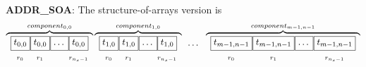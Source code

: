 \textbf{ADDR\_SOA}: The structure-of-arrays version is
\[
\overbrace{
\begin{array}{cc} \boxed{t_{0,0}} \\  _{r_0} \end{array} \mkern-17mu
\begin{array}{cc} \boxed{t_{0,0}} \\  _{r_1} \end{array} \mkern-17mu
\begin{array}{cc} \boxed{\ldots\vphantom{t_{0,0}}} \\ \phantom{r_2}\end{array} \mkern-18mu
\begin{array}{cc} \boxed{t_{0,0}} \\  _{r_{n_s-1}} \end{array}
}^{component_{0,0}}
\overbrace{
\begin{array}{cc} \boxed{t_{1,0}} \\  _{r_0} \end{array} \mkern-17mu
\begin{array}{cc} \boxed{t_{1,0}} \\  _{r_1} \end{array} \mkern-17mu
\begin{array}{cc} \boxed{\ldots\vphantom{t_{0,0}}} \\ \phantom{r_2}\end{array} \mkern-18mu
\begin{array}{cc} \boxed{t_{1,0}} \\  _{r_{n_s-1}} \end{array}
}^{component_{1,0}}
\begin{array}{cc} \ldots\vphantom{t_{n-1}} \\ \phantom{r_2}\end{array}
\overbrace{
\begin{array}{cc} \boxed{t_{m-1,n-1}} \\  _{r_0} \end{array} \mkern-17mu
\begin{array}{cc} \boxed{t_{m-1,n-1}} \\  _{r_1} \end{array} \mkern-17mu
\begin{array}{cc} \boxed{\ldots\vphantom{t_{0,0}}} \\ \phantom{r_2}\end{array} \mkern-17mu
\begin{array}{cc} \boxed{t_{m-1,n-1}} \\  _{r_{n_s-1}} \end{array}
}^{component_{m-1,n-1}}
\]

